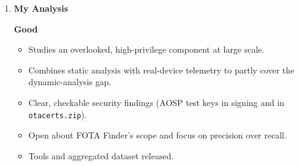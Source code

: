 \documentclass[11pt,a4paper]{article}
\newcommand{\entrypart}[1]{\textbf{\color{accent}#1}\par\vspace{2pt}}
\begin{document}
\begin{enumerate}
    \vspace{4pt}
    \textbf{Limitations (authors)}
    \begin{itemize}[leftmargin=*,itemsep=1pt,topsep=2pt]
        \item FOTA Finder only finds apps using FOTA-specific APIs or known strings; misses custom implementations, native code.
        \item ODEX parsing fails for 37\% of apps; larger coverage might change the distribution.
        \item Static analysis only: dynamic code loading, reflection, native code, string obfuscation may hide behaviors or cause missed FOTAs.
        \item Findings show potential behaviors, not runtime observations.
        \item Stakeholder classification relies on certificates, package names, and manual web searches; possible mislabels (e.g., an OEM labeled as SoC).
        \item Telemetry limited to installs through PackageInstaller; covers a subset of FOTA installs (lower bound). Package-name matching could be spoofed (partly addressed using certificates).
        \item Dynamic analysis not possible (platform-key signing, device dependencies, avoid production servers); other update steps (e.g., server exchanges) not analyzed.
        \item Low \texttt{otacerts.zip} coverage (Firmware Scanner added the feature only in November 2019; FOTA Finder limits).
        \item Treble and Mainline not analyzed.
        \item Why six FOTA apps were accepted on Google Play is unexplained.
    \end{itemize}

    \item \entrypart{My Analysis}

    \textbf{Good}
    \begin{itemize}[leftmargin=*,itemsep=1pt,topsep=2pt]
        \item Studies an overlooked, high-privilege component at large scale.
        \item Combines static analysis with real-device telemetry to partly cover the dynamic-analysis gap.
        \item Clear, checkable security findings (AOSP test keys in signing and in \texttt{otacerts.zip}).
        \item Open about FOTA Finder's scope and focus on precision over recall.
        \item Tools and aggregated dataset released.
    \end{itemize}


\end{enumerate}
\end{document}
